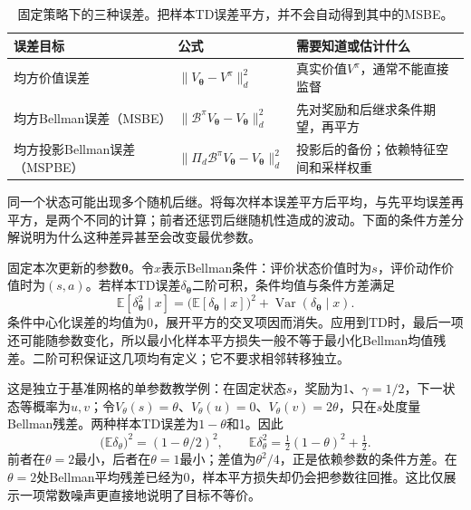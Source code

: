 \begin{table}[t]
  \centering
  \small
  \begin{tabularx}{\linewidth}{>{\raggedright\arraybackslash}p{30mm} >{\raggedright\arraybackslash}X >{\raggedright\arraybackslash}X}
    \toprule
    误差目标 & 公式 & 需要知道或估计什么 \\
    \midrule
    均方价值误差 & $\lVert V_{\bm{\theta}}-V^\pi\rVert_d^2$ & 真实价值$V^\pi$，通常不能直接监督 \\
    均方Bellman误差（MSBE） & $\lVert \mathcal B^\pi V_{\bm{\theta}}-V_{\bm{\theta}}\rVert_d^2$ & 先对奖励和后继求条件期望，再平方 \\
    均方投影Bellman误差（MSPBE） & $\lVert\Pi_d\mathcal B^\pi V_{\bm{\theta}}-V_{\bm{\theta}}\rVert_d^2$ & 投影后的备份；依赖特征空间和采样权重 \\
    \bottomrule
  \end{tabularx}
  \caption{固定策略下的三种误差。把样本TD误差平方，并不会自动得到其中的MSBE。}
  \label{tab:rl-learning-value-objectives}
\end{table}

同一个状态可能出现多个随机后继。将每次样本误差平方后平均，与先平均误差再平方，是两个不同的计算；前者还惩罚后继随机性造成的波动。下面的条件方差分解说明为什么这种差异甚至会改变最优参数。

固定本次更新的参数$\bm\theta$。令$x$表示Bellman条件：评价状态价值时为$s$，评价动作价值时为$(s,a)$。若样本TD误差$\delta_{\bm\theta}$二阶可积，条件均值与条件方差满足
\begin{equation}
 \mathbb E[\delta_{\bm\theta}^2\mid x]
  =\bigl(\mathbb E[\delta_{\bm\theta}\mid x]\bigr)^2
     +\operatorname{Var}(\delta_{\bm\theta}\mid x).
 \label{eq:rl-learning-td-variance}
\end{equation}
条件中心化误差的均值为0，展开平方的交叉项因而消失。应用到TD时，最后一项还可能随参数变化，所以最小化样本平方损失一般不等于最小化Bellman均值残差。二阶可积保证这几项均有定义；它不要求相邻转移独立。

\begin{example}[两个后继使最优参数改变]
  \label{ex:rl-learning-double-sampling}
  这是独立于基准网格的单参数教学例：在固定状态$s$，奖励为1、$\gamma=1/2$，下一状态等概率为$u,v$；令$V_\theta(s)=\theta$、$V_\theta(u)=0$、$V_\theta(v)=2\theta$，只在$s$处度量Bellman残差。两种样本TD误差为$1-\theta$和1。因此
  \[
    \bigl(\mathbb E\delta_\theta\bigr)^2=(1-\theta/2)^2,\qquad
    \mathbb E\delta_\theta^2=\tfrac12(1-\theta)^2+\tfrac12.
  \]
  前者在$\theta=2$最小，后者在$\theta=1$最小；差值为$\theta^2/4$，正是依赖参数的条件方差。在$\theta=2$处Bellman平均残差已经为0，样本平方损失却仍会把参数往回推。这比仅展示一项常数噪声更直接地说明了目标不等价。
\end{example}

